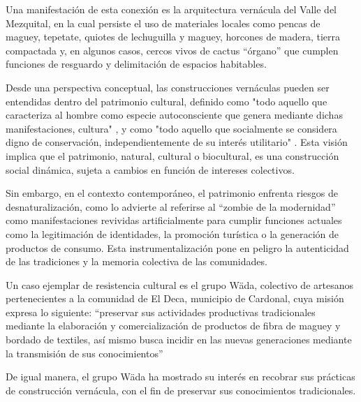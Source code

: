 Una manifestación de esta conexión es la arquitectura vernácula del Valle del Mezquital, en la cual persiste el uso de materiales locales como pencas de maguey, tepetate, quiotes de lechuguilla y maguey, horcones de madera, tierra compactada y, en algunos casos, cercos vivos de cactus ``órgano'' que cumplen funciones de resguardo y delimitación de espacios habitables.

Desde una perspectiva conceptual, las construcciones vernáculas pueden ser entendidas dentro del patrimonio cultural, definido como "todo aquello que caracteriza al hombre como especie autoconsciente que genera mediante dichas manifestaciones, cultura" \citep{dominguez2004pautas}, y como "todo aquello que socialmente se considera digno de conservación, independientemente de su interés utilitario" \citep[p. 63]{prats1998concepto}. Esta visión implica que el patrimonio, natural, cultural o biocultural, es una construcción social dinámica, sujeta a cambios en función de intereses colectivos.

Sin embargo, en el contexto contemporáneo, el patrimonio enfrenta riesgos de desnaturalización, como lo advierte \cite{i2008zombi} al referirse al ``zombie de la modernidad'' como manifestaciones revividas artificialmente para cumplir funciones actuales como la legitimación de identidades, la promoción turística o la generación de productos de consumo. Esta instrumentalización pone en peligro la autenticidad de las tradiciones y la memoria colectiva de las comunidades.

Un caso ejemplar de resistencia cultural es el grupo Wäda, colectivo de artesanos pertenecientes a la comunidad de El Deca, municipio de Cardonal, cuya misión expresa lo siguiente: ``preservar sus actividades productivas tradicionales mediante la elaboración y comercialización de productos de fibra de maguey y bordado de textiles, así mismo busca incidir en las nuevas generaciones mediante la transmisión de sus conocimientos''

De igual manera, el grupo Wäda ha mostrado su interés en recobrar sus prácticas de construcción vernácula, con el fin de preservar sus conocimientos tradicionales.
